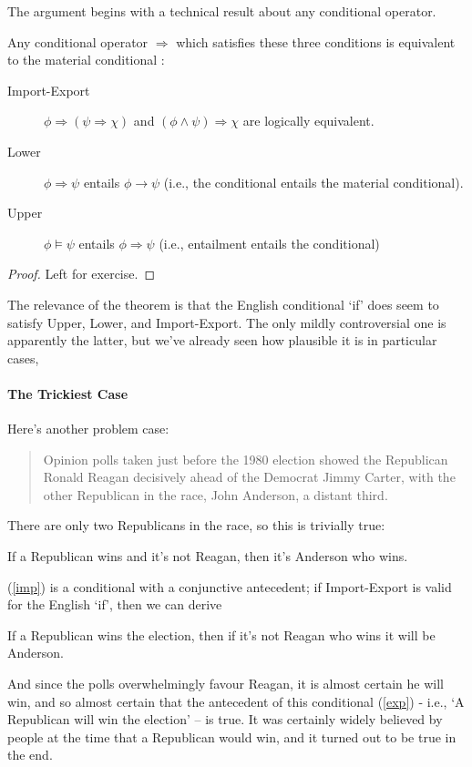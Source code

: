The argument begins with a technical result about any conditional operator.
\begin{theorem}[Gibbard]
Any conditional operator $\Rightarrow$ which satisfies these three conditions is equivalent to the material conditional \citep{gibbard}\label{gibb}:
\begin{description}
	\item[Import-Export] $\phi \Rightarrow (\psi \Rightarrow \chi)$ and $(\phi\wedge \psi)\Rightarrow \chi$ are logically equivalent.
\item[Lower] $\phi \Rightarrow \psi$ entails $\phi \to \psi$ (i.e., the conditional entails the material conditional).
\item[Upper] $\phi \vDash \psi$ entails $\phi \Rightarrow \psi$ (i.e., entailment entails the conditional)
\end{description}
\begin{proof}
	Left for exercise.
\end{proof}
\end{theorem}
The relevance of the theorem is that the English conditional `if' does seem to satisfy Upper, Lower, and Import-Export. The only mildly controversial one is apparently the latter, but we've already seen how plausible it is in particular cases,



\paragraph{The Trickiest Case}


Here's another problem case: \begin{quote}
	Opinion polls taken just before the 1980 election showed the Republican Ronald Reagan decisively ahead of the Democrat Jimmy Carter, with the other Republican in the race, John Anderson, a distant third.  \citep{mcgee}
\end{quote} There are only two Republicans in the race, so this is trivially true: \begin{exe}
	\ex If a Republican wins and it's not Reagan, then it's Anderson who wins.\label{imp}
\end{exe} (\ref{imp}) is a conditional with a conjunctive antecedent; if Import-Export is valid for the English `if', then we can derive \begin{exe}
	\ex If a Republican wins the election, then if it’s not Reagan who wins it will be Anderson.\label{exp}
\end{exe}
And since the polls overwhelmingly favour Reagan, it is almost certain he will win, and so almost certain that the antecedent of this conditional (\ref{exp}) - i.e., `A Republican will win the election' – is true. It was certainly widely believed by people at the time that a Republican would win, and it turned out to be true in the end.

